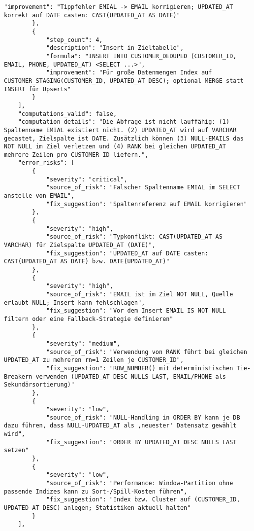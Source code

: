 \begin{lstlisting}[caption={Ausgabe: GPT-5 Anwendungsfall 2 Hauptdurchlauf},label={gpt_case2_prompt1}]
            "improvement": "Tippfehler EMIAL -> EMAIL korrigieren; UPDATED_AT korrekt auf DATE casten: CAST(UPDATED_AT AS DATE)"
        },
        {
            "step_count": 4,
            "description": "Insert in Zieltabelle",
            "formula": "INSERT INTO CUSTOMER_DEDUPED (CUSTOMER_ID, EMAIL, PHONE, UPDATED_AT) <SELECT ...>",
            "improvement": "Für große Datenmengen Index auf CUSTOMER_STAGING(CUSTOMER_ID, UPDATED_AT DESC); optional MERGE statt INSERT für Upserts"
        }
    ],
    "computations_valid": false,
    "computation_details": "Die Abfrage ist nicht lauffähig: (1) Spaltenname EMIAL existiert nicht. (2) UPDATED_AT wird auf VARCHAR gecastet, Zielspalte ist DATE. Zusätzlich können (3) NULL-EMAILS das NOT NULL im Ziel verletzen und (4) RANK bei gleichen UPDATED_AT mehrere Zeilen pro CUSTOMER_ID liefern.",
    "error_risks": [
        {
            "severity": "critical",
            "source_of_risk": "Falscher Spaltenname EMIAL im SELECT anstelle von EMAIL",
            "fix_suggestion": "Spaltenreferenz auf EMAIL korrigieren"
        },
        {
            "severity": "high",
            "source_of_risk": "Typkonflikt: CAST(UPDATED_AT AS VARCHAR) für Zielspalte UPDATED_AT (DATE)",
            "fix_suggestion": "UPDATED_AT auf DATE casten: CAST(UPDATED_AT AS DATE) bzw. DATE(UPDATED_AT)"
        },
        {
            "severity": "high",
            "source_of_risk": "EMAIL ist im Ziel NOT NULL, Quelle erlaubt NULL; Insert kann fehlschlagen",
            "fix_suggestion": "Vor dem Insert EMAIL IS NOT NULL filtern oder eine Fallback-Strategie definieren"
        },
        {
            "severity": "medium",
            "source_of_risk": "Verwendung von RANK führt bei gleichen UPDATED_AT zu mehreren rn=1 Zeilen je CUSTOMER_ID",
            "fix_suggestion": "ROW_NUMBER() mit deterministischen Tie-Breakern verwenden (UPDATED_AT DESC NULLS LAST, EMAIL/PHONE als Sekundärsortierung)"
        },
        {
            "severity": "low",
            "source_of_risk": "NULL-Handling in ORDER BY kann je DB dazu führen, dass NULL-UPDATED_AT als ,neuester' Datensatz gewählt wird",
            "fix_suggestion": "ORDER BY UPDATED_AT DESC NULLS LAST setzen"
        },
        {
            "severity": "low",
            "source_of_risk": "Performance: Window-Partition ohne passende Indizes kann zu Sort-/Spill-Kosten führen",
            "fix_suggestion": "Index bzw. Cluster auf (CUSTOMER_ID, UPDATED_AT DESC) anlegen; Statistiken aktuell halten"
        }
    ],

\end{lstlisting}
